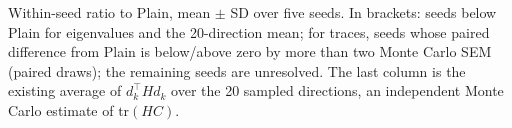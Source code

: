 \begin{table}[!t]
\begin{tabular*}{\linewidth}{@{\extracolsep{\fill}}lrrrrrr@{}}
\bottomrule
\end{tabular*}
\par\smallskip\begin{minipage}{\linewidth}\footnotesize Within-seed ratio to Plain, mean $\pm$ SD over five seeds. In brackets: seeds below Plain for eigenvalues and the 20-direction mean; for traces, seeds whose paired difference from Plain is below/above zero by more than two Monte Carlo SEM (paired draws); the remaining seeds are unresolved. The last column is the existing average of $d_k^\top Hd_k$ over the 20 sampled directions, an independent Monte Carlo estimate of $\mathrm{tr}(HC)$.\end{minipage}
\end{table}
